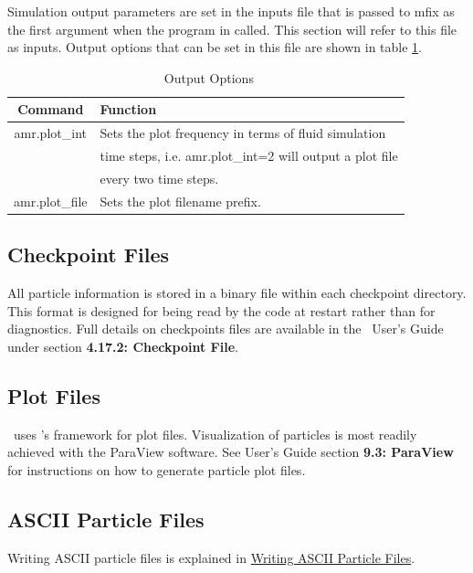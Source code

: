 Simulation output parameters are set in the inputs file that is passed to mfix
as the first argument when the program in called. This section will refer
to this file as {\sf inputs}. Output options that can be set in this file are 
shown in table \ref{table:amropts}.  

\begin{table}
\begin{center}
  \begin{tabular}{||c| l||}
    \hline
    Command & Function \\ [0.5ex]
    \hline\hline
    {\sf amr.plot\_int} & Sets the plot frequency in terms of fluid simulation\\
                        & time steps, i.e. {\sf amr.plot\_int=2} will output a
                          plot file \\
                        & every two time steps. \\   
     \hline
    {\sf amr.plot\_file} & Sets the plot filename prefix. \\
     \hline
  \end{tabular}
\end{center}
\caption{\amrex\ Output Options}
\label{table:amropts}
\end{table}

\subsection{Checkpoint Files}

All particle information is stored in a binary file within each checkpoint 
directory. This format is designed for being read by the code at restart rather 
than for diagnostics. Full details on checkpoints files are available in the
\amrex\ User's Guide under section {\bf 4.17.2: Checkpoint File}.


\subsection{Plot Files}

\mfix\ uses \amrex's framework for plot files. Visualization of particles is 
most readily achieved with the ParaView software. See \amrex User's Guide section 
{\bf 9.3: ParaView} for instructions on how to generate particle plot files. 


\subsection{ASCII Particle Files}
Writing ASCII particle files is explained in \hyperref[sec:AsciiFiles]{Writing ASCII 
Particle Files}.







